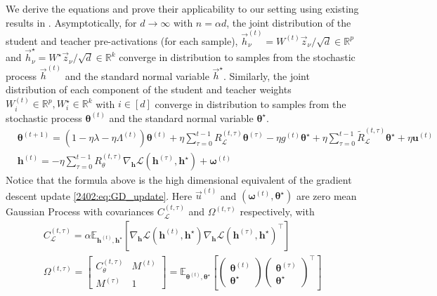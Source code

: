 We derive the equations and prove their applicability to our setting using existing results in \citep{celentano2021high,gerbelot2022rigorous}. Asymptotically, for $d \to \infty$ with $n = \alpha d$, the joint distribution of the student and teacher pre-activations (for each sample), $\vec h^{(t)}_\nu  =  W^{(t)} \vec z_\nu / \sqrt{d}  \in  \mathbb{R}^p$ and  $\vec h^\star_\nu  =  W^\star \vec z_\nu / \sqrt{d}  \in  \mathbb{R}^k$ converge in distribution to samples from the stochastic process $\vec h^{(t)}$ and the standard normal variable $\vec h^\star$. Similarly, the joint distribution of each component of the student and teacher weights $W^{(t)}_i \in \mathbb{R}^p,W^\star_i \in \mathbb{R}^k$ with $i \in [d]$ converge in distribution to samples from the stochastic process $\boldsymbol \theta^{(t)}$ and the standard normal variable $\boldsymbol\theta^\star$.
\begin{align}
\label{2402:eq:def_processes_main}
&\boldsymbol{\theta}^{(t+1)} = \left(1- \eta\lambda -\eta\Lambda^{(t)}\right)\boldsymbol{\theta}^{(t)} 
    +  \eta \sum_{\tau=0}^{t-1}  R_\mathcal{L}^{(t,\tau)}\boldsymbol{\theta}^{(\tau)} -  \eta g^{(t)}\boldsymbol{\theta}^\star +  \eta \sum_{\tau=0}^{t-1}  \tilde R_\mathcal{L}^{(t,\tau)}\boldsymbol{\theta}^\star +  \eta \boldsymbol{u}^{(t)}\\ \label{2402:eq:def_processes_main_2}
    &\boldsymbol{h}^{(t)} = -\eta\sum_{\tau=0}^{t-1}R_\theta^{(t,\tau)} \nabla_{\boldsymbol{h}} \mathcal{L}(\boldsymbol{h}^{(\tau)}, \boldsymbol{h}^\star) + \boldsymbol{\omega}^{(t)}
\end{align}
Notice that the formula above is the high dimensional equivalent of the gradient descent update \eqref{2402:eq:GD_update}. Here $\vec u^{(t)}$ and $(\boldsymbol \omega^{(t)}, \boldsymbol \theta^\star)$ are zero mean Gaussian Process with covariances $C_\mathcal{L}^{(t,\tau)}$ and $\Omega^{(t,\tau)}$ respectively, with
\begin{align} %
    C_\mathcal{L}^{(t, \tau)}   = 
    \alpha \mathbb{E}_{\boldsymbol{h}^{(t)}, \boldsymbol{h}^\star} \left[ \nabla_{\boldsymbol{h}} \mathcal{L}(\boldsymbol{h}^{(t)}, \boldsymbol{h}^\star)\nabla_{\boldsymbol{h}} \mathcal{L}(\boldsymbol{h}^{(\tau)}, \boldsymbol{h}^\star)^\top \right] \nonumber \\
    \Omega^{(t,\tau)}   =    \begin{bmatrix}
        C_\theta^{(t,\tau)} & M^{(t)} \\
        M^{(\tau)} & 1
    \end{bmatrix}   =   \mathbb{E}_{\boldsymbol{\theta}^{(t)}, \boldsymbol{\theta}^\star} \left[ \begin{pmatrix}
        \boldsymbol{\theta}^{(t)} \\    \boldsymbol{\theta}^\star
    \end{pmatrix} \begin{pmatrix}
        \boldsymbol{\theta}^{(\tau)}    \\ \boldsymbol{\theta}^\star  
    \end{pmatrix}^\top  \right] \nonumber
\end{align}
